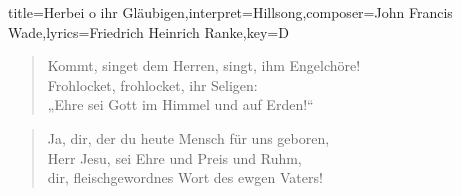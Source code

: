 \documentclass{leadsheet-modern}
\begin{document}
\begin{song}{title={Herbei o ihr Gläubigen},interpret={Hillsong},composer={John Francis Wade},lyrics={Friedrich Heinrich Ranke},key={D}}
\begin{verse}
Kommt, singet dem Herren, singt, ihm Engelchöre! \\
Frohlocket, frohlocket, ihr Seligen: \\
„Ehre sei Gott im Himmel und auf Erden!“ \\
\end{verse}

\begin{verse}
Ja, dir, der du heute Mensch für uns geboren, \\
Herr Jesu, sei Ehre und Preis und Ruhm, \\
dir, fleischgewordnes Wort des ewgen Vaters! 
\end{verse}

\end{song}
\end{document}
